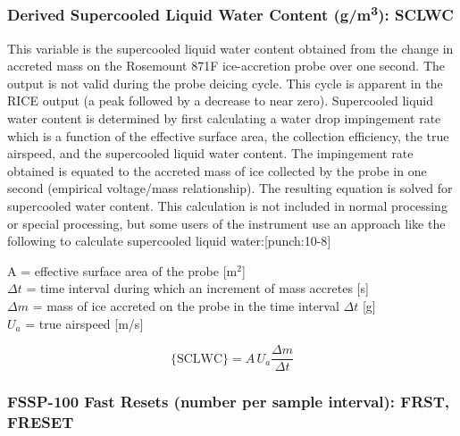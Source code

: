 \documentclass[
  english,
]{book}
\begin{document}
\hypertarget{SCLWC}{%
\subsubsection*{\texorpdfstring{Derived Supercooled Liquid Water Content (g/m\textsuperscript{3}): SCLWC}{Derived Supercooled Liquid Water Content (g/m3): SCLWC}}\label{SCLWC}}

This variable is the supercooled liquid water content obtained from the change in accreted mass on the Rosemount 871F ice-accretion probe over one second. The output is not valid during the probe deicing cycle. This cycle is apparent in the RICE output (a peak followed by a decrease to near zero). Supercooled liquid water content is determined by first calculating a water drop impingement rate which is a function of the effective surface area, the collection efficiency, the true airspeed, and the supercooled liquid water content. The impingement rate obtained is equated to the accreted mass of ice collected by the probe in one second (empirical voltage/mass relationship). The resulting equation is solved for supercooled water content. This calculation is not included in normal processing or special processing, but some users of the instrument use an approach like the following to calculate supercooled liquid water:\protect\hypertarget{punch:10-8}{}{{[}punch:10-8{]}}

A = effective surface area of the probe {[}m\(^{2}\){]}\\
\(\Delta t\) = time interval
during which an increment of mass accretes {[}s{]}\\
\(\Delta m\) = mass of ice accreted on the
probe in the time interval \(\Delta t\) {[}g{]}\\
\(U_{a}\) = true airspeed {[}m/s{]}

\begin{equation}
\mathrm{\{SCLWC\}}=A\,U_{a}\frac{\Delta m}{\Delta t}
\label{eq:SCLWCbox}
\end{equation}

\hypertarget{freset}{%
\subsubsection*{FSSP-100 Fast Resets (number per sample interval): FRST, FRESET}\label{freset}}
\end{document}
